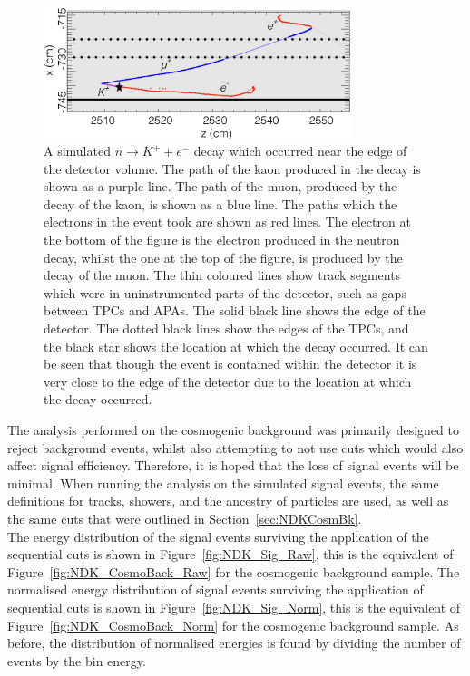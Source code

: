 \begin{figure}
  \centering
  \includegraphics[width=0.8\textwidth]{KaonElecNearEdge}
  \caption[A simulated $n \rightarrow K^{+} + e^{-}$ decay which occurred near the edge of the detector volume]
          {A simulated $n \rightarrow K^{+} + e^{-}$ decay which occurred near the edge of the detector volume. The path of the kaon produced in the decay is shown as a purple line. The path of the muon, produced by the decay of the kaon, is shown as a blue line. The paths which the electrons in the event took are shown as red lines. The electron at the bottom of the figure is the electron produced in the neutron decay, whilst the one at the top of the figure, is produced by the decay of the muon. The thin coloured lines show track segments which were in uninstrumented parts of the detector, such as gaps between TPCs and APAs. The solid black line shows the edge of the detector. The dotted black lines show the edges of the TPCs, and the black star shows the location at which the decay occurred. It can be seen that though the event is contained within the detector it is very close to the edge of the detector due to the location at which the decay occurred.}
  \label{fig:NDK_Sig_KENearEdge}
\end{figure}

The analysis performed on the cosmogenic background was primarily designed to reject background events, whilst also attempting to not use cuts which would also affect signal efficiency. Therefore, it is hoped that the loss of signal events will be minimal. When running the analysis on the simulated signal events, the same definitions for tracks, showers, and the ancestry of particles are used, as well as the same cuts that were outlined in Section~\ref{sec:NDKCosmBk}. \\

The energy distribution of the signal events surviving the application of the sequential cuts is shown in Figure~\ref{fig:NDK_Sig_Raw}, this is the equivalent of Figure~\ref{fig:NDK_CosmoBack_Raw} for the cosmogenic background sample. The normalised energy distribution of signal events surviving the application of sequential cuts is shown in Figure~\ref{fig:NDK_Sig_Norm}, this is the equivalent of Figure~\ref{fig:NDK_CosmoBack_Norm} for the cosmogenic background sample. As before, the distribution of normalised energies is found by dividing the number of events by the bin energy. \\

